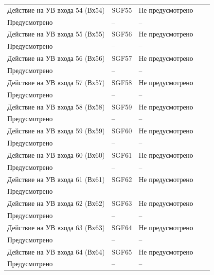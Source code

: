 \begin{longtable}{|>{\centering\arraybackslash}m{5.3cm}|>{\centering\arraybackslash}m{3.3cm}|>{\centering\arraybackslash}m{4.2cm}|>{\centering\arraybackslash}m{1.8cm}|>{\centering\arraybackslash}m{1cm}|}
\hline
\centering Действие на УВ входа 54 (Вх54)  & \centering SGF55 & \centering Не предусмотрено \\ Предусмотрено & \centering -- & \centering \arraybackslash -- \\
\hline
\centering Действие на УВ входа 55 (Вх55)  & \centering SGF56 & \centering Не предусмотрено \\ Предусмотрено & \centering -- & \centering \arraybackslash -- \\
\hline
\centering Действие на УВ входа 56 (Вх56)  & \centering SGF57 & \centering Не предусмотрено \\ Предусмотрено & \centering -- & \centering \arraybackslash -- \\
\hline
\centering Действие на УВ входа 57 (Вх57)  & \centering SGF58 & \centering Не предусмотрено \\ Предусмотрено & \centering -- & \centering \arraybackslash -- \\
\hline
\centering Действие на УВ входа 58 (Вх58)  & \centering SGF59 & \centering Не предусмотрено \\ Предусмотрено & \centering -- & \centering \arraybackslash -- \\
\hline
\centering Действие на УВ входа 59 (Вх59)  & \centering SGF60 & \centering Не предусмотрено \\ Предусмотрено & \centering -- & \centering \arraybackslash -- \\
\hline
\centering Действие на УВ входа 60 (Вх60)  & \centering SGF61 & \centering Не предусмотрено \\ Предусмотрено & \centering -- & \centering \arraybackslash -- \\
\hline
\centering Действие на УВ входа 61 (Вх61)  & \centering SGF62 & \centering Не предусмотрено \\ Предусмотрено & \centering -- & \centering \arraybackslash -- \\
\hline
\centering Действие на УВ входа 62 (Вх62)  & \centering SGF63 & \centering Не предусмотрено \\ Предусмотрено & \centering -- & \centering \arraybackslash -- \\
\hline
\centering Действие на УВ входа 63 (Вх63)  & \centering SGF64 & \centering Не предусмотрено \\ Предусмотрено & \centering -- & \centering \arraybackslash -- \\
\hline
\centering Действие на УВ входа 64 (Вх64)  & \centering SGF65 & \centering Не предусмотрено \\ Предусмотрено & \centering -- & \centering \arraybackslash -- \\

\end{longtable}
